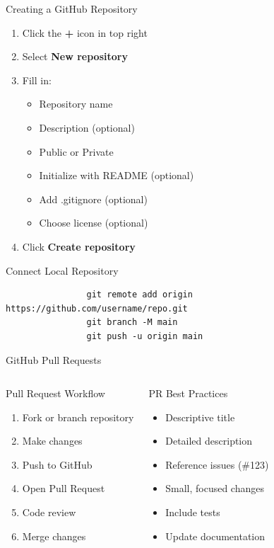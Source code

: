 \documentclass[aspectratio=169]{beamer}
\begin{document}
	\begin{frame}{Creating a GitHub Repository}
		\begin{enumerate}
			\item Click the \textbf{+} icon in top right
			\item Select \textbf{New repository}
			\item Fill in:
			\begin{itemize}
				\item Repository name
				\item Description (optional)
				\item Public or Private
				\item Initialize with README (optional)
				\item Add .gitignore (optional)
				\item Choose license (optional)
			\end{itemize}
			\item Click \textbf{Create repository}
		\end{enumerate}
		
		\vspace{0.3cm}
		\begin{exampleblock}{Connect Local Repository}
			\begin{verbatim}
				git remote add origin https://github.com/username/repo.git
				git branch -M main
				git push -u origin main
			\end{verbatim}
		\end{exampleblock}
	\end{frame}
	
	\begin{frame}{GitHub Pull Requests}
		\begin{columns}
			\begin{block}{Pull Request Workflow}
				\begin{enumerate}
					\item Fork or branch repository
					\item Make changes
					\item Push to GitHub
					\item Open Pull Request
					\item Code review
					\item Merge changes
				\end{enumerate}
			\end{block}
			
			\begin{block}{PR Best Practices}
				\begin{itemize}
					\item Descriptive title
					\item Detailed description
					\item Reference issues (\#123)
					\item Small, focused changes
					\item Include tests
					\item Update documentation
				\end{itemize}
			\end{block}
		\end{columns}
	\end{frame}
	
\end{document}
